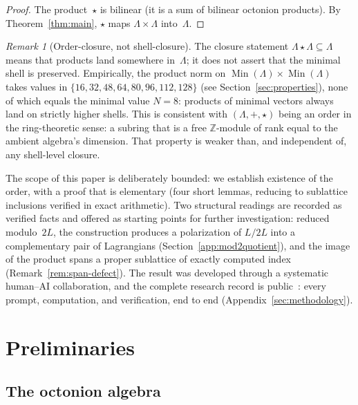 \documentclass[twoside,english]{paper}
\numberwithin{equation}{section}
\numberwithin{figure}{section}
\theoremstyle{definition}
\theoremstyle{remark}
\newtheorem{remark}[theorem]{Remark}
\newcommand{\ZZ}{\mathbb{Z}}
\newcommand{\LL}{\Lambda}             %
\newcommand{\Nrm}{N}                  %
\begin{document}
\begin{proof}
The product~$\star$ is bilinear (it is a sum of bilinear octonion
products).  By Theorem~\ref{thm:main}, $\star$ maps $\LL \times \LL$
into~$\LL$.
\end{proof}

\begin{remark}[Order-closure, not shell-closure]\label{rem:order-closure}
The closure statement $\LL \star \LL \subseteq \LL$ means that
products land somewhere in~$\LL$; it does not assert that the
minimal shell is preserved.  Empirically, the product norm on
$\operatorname{Min}(\LL) \times \operatorname{Min}(\LL)$ takes values
in $\{16, 32, 48, 64, 80, 96, 112, 128\}$ (see
Section~\ref{sec:properties}), none of which equals the minimal value
$\Nrm = 8$: products of minimal vectors always land on strictly
higher shells.  This is consistent with $(\LL, +, \star)$ being an
order in the ring-theoretic sense: a subring that is a free
$\ZZ$-module of rank equal to the ambient algebra's dimension.
That property is weaker than, and independent of, any shell-level
closure.
\end{remark}

The scope of this paper is deliberately bounded: we establish
existence of the order, with a proof that is elementary (four
short lemmas, reducing to sublattice inclusions verified in exact
arithmetic).  Two
structural readings are recorded as verified facts and offered as
starting points for further investigation: reduced modulo~$2L$, the
construction produces a polarization of $L/2L$ into a complementary
pair of Lagrangians (Section~\ref{app:mod2quotient}), and the image
of the product spans a proper sublattice of exactly computed index
(Remark~\ref{rem:span-defect}).  The result was developed through a
systematic human--AI collaboration, and the complete research record
is public~\cite{repo}: every prompt, computation, and verification,
end to end (Appendix~\ref{sec:methodology}).

\section{Preliminaries}\label{sec:prelim}

\subsection{The octonion algebra}
\end{document}
